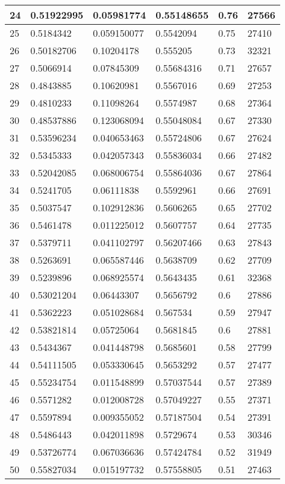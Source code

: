 \begin{longtable}{|l|l|l|l|l|l|}
24 & 0.51922995 & 0.05981774 & 0.55148655 & 0.76 & 27566 \\ \hline 
25 & 0.5184342 & 0.059150077 & 0.5542094 & 0.75 & 27410 \\ \hline 
26 & 0.50182706 & 0.10204178 & 0.555205 & 0.73 & 32321 \\ \hline 
27 & 0.5066914 & 0.07845309 & 0.55684316 & 0.71 & 27657 \\ \hline 
28 & 0.4843885 & 0.10620981 & 0.5567016 & 0.69 & 27253 \\ \hline 
29 & 0.4810233 & 0.11098264 & 0.5574987 & 0.68 & 27364 \\ \hline 
30 & 0.48537886 & 0.123068094 & 0.55048084 & 0.67 & 27330 \\ \hline 
31 & 0.53596234 & 0.040653463 & 0.55724806 & 0.67 & 27624 \\ \hline 
32 & 0.5345333 & 0.042057343 & 0.55836034 & 0.66 & 27482 \\ \hline 
33 & 0.52042085 & 0.068006754 & 0.55864036 & 0.67 & 27864 \\ \hline 
34 & 0.5241705 & 0.06111838 & 0.5592961 & 0.66 & 27691 \\ \hline 
35 & 0.5037547 & 0.102912836 & 0.5606265 & 0.65 & 27702 \\ \hline 
36 & 0.5461478 & 0.011225012 & 0.5607757 & 0.64 & 27735 \\ \hline 
37 & 0.5379711 & 0.041102797 & 0.56207466 & 0.63 & 27843 \\ \hline 
38 & 0.5263691 & 0.065587446 & 0.5638709 & 0.62 & 27709 \\ \hline 
39 & 0.5239896 & 0.068925574 & 0.5643435 & 0.61 & 32368 \\ \hline 
40 & 0.53021204 & 0.06443307 & 0.5656792 & 0.6 & 27886 \\ \hline 
41 & 0.5362223 & 0.051028684 & 0.567534 & 0.59 & 27947 \\ \hline 
42 & 0.53821814 & 0.05725064 & 0.5681845 & 0.6 & 27881 \\ \hline 
43 & 0.5434367 & 0.041448798 & 0.5685601 & 0.58 & 27799 \\ \hline 
44 & 0.54111505 & 0.053330645 & 0.5653292 & 0.57 & 27477 \\ \hline 
45 & 0.55234754 & 0.011548899 & 0.57037544 & 0.57 & 27389 \\ \hline 
46 & 0.5571282 & 0.012008728 & 0.57049227 & 0.55 & 27371 \\ \hline 
47 & 0.5597894 & 0.009355052 & 0.57187504 & 0.54 & 27391 \\ \hline 
48 & 0.5486443 & 0.042011898 & 0.5729674 & 0.53 & 30346 \\ \hline 
49 & 0.53726774 & 0.067036636 & 0.57424784 & 0.52 & 31949 \\ \hline 
50 & 0.55827034 & 0.015197732 & 0.57558805 & 0.51 & 27463 \\ \hline 
\end{longtable}